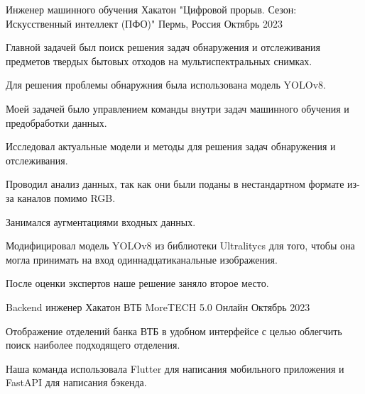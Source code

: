 

\begin{cventries}

\cventry
{Инженер машинного обучения} %
{Хакатон "Цифровой прорыв. Сезон: Искусственный интеллект (ПФО)"} %
{Пермь, Россия} %
{Октябрь 2023} %
{
  \begin{cvitems} %
    \item {Главной задачей был поиск решения задач обнаружения и отслеживания предметов твердых бытовых отходов на мультиспектральных снимках. }
    \item {Для решения проблемы обнаружния была использована модель YOLOv8. } 
    \item {Моей задачей было управлением команды внутри задач машинного обучения и предобработки данных. }
    \item {Исследовал актуальные модели и методы для решения задач обнаружения и отслеживания. }
    \item {Проводил анализ данных, так как они были поданы в нестандартном формате из-за каналов помимо RGB. }
    \item {Занимался аугментациями входных данных. }
    \item {Модифицировал модель YOLOv8 из библиотеки Ultralitycs для того, чтобы она могла принимать на вход одиннадцатиканальные изображения. }
    \item {После оценки экспертов наше решение заняло второе место. }
  \end{cvitems}
}
\cventry
{Backend инженер} %
{Хакатон ВТБ MoreTECH 5.0} %
{Онлайн} %
{Октябрь 2023} %
{
  \begin{cvitems} %
    \item {Отображение отделений банка ВТБ в удобном интерфейсе с целью облегчить поиск наиболее подходящего отделения. }
    \item {Наша команда использовала Flutter для написания мобильного приложения и FastAPI для написания бэкенда. } 

\end{cvitems}}
\end{cventries}
